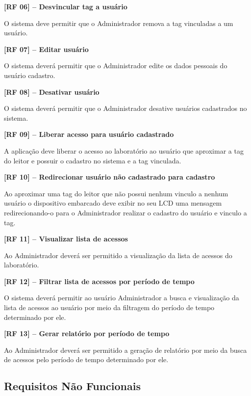    \noindent
    \textbf{[RF 06] – Desvincular tag a usuário}
    
        O sistema deve permitir que o Administrador remova a tag vinculadas a um usuário.
    
    \noindent
    \textbf{[RF 07] – Editar usuário}
    
        O sistema deverá permitir que o Administrador edite os dados pessoais do usuário cadastro.
    
    \noindent
    \textbf{[RF 08] – Desativar usuário}
   
        O sistema deverá permitir que o Administrador desative usuários cadastrados no sistema.
        
    \noindent
    \textbf{[RF 09] – Liberar acesso para usuário cadastrado}
    
        A aplicação deve liberar o acesso ao laboratório ao usuário que aproximar a tag do leitor e possuir o cadastro no sistema e a tag vinculada.
    
    \noindent
    \textbf{[RF 10] – Redirecionar usuário não cadastrado para cadastro}
    
        Ao aproximar uma tag do leitor que não possui nenhum vinculo a nenhum usuário o dispositivo embarcado deve exibir no seu LCD uma mensagem redirecionando-o para o Administrador realizar o cadastro do usuário e vinculo a tag.
    
    \noindent
    \textbf{[RF 11] – Visualizar lista de acessos}
    
        Ao Administrador deverá ser permitido a visualização da lista de acessos do laboratório.
    
    \noindent
    \textbf{[RF 12] – Filtrar lista de acessos por período de tempo}
    
        O sistema deverá permitir ao usuário Administrador a busca e visualização da lista de acessos ao usuário por meio da filtragem do período de tempo determinado por ele.
    
    \noindent
    \textbf{[RF 13] – Gerar relatório por período de tempo}
    
        Ao Administrador deverá ser permitido a geração de relatório por meio da busca de acessos pelo período de tempo determinado por ele.


    \subsection{Requisitos Não Funcionais}
    
